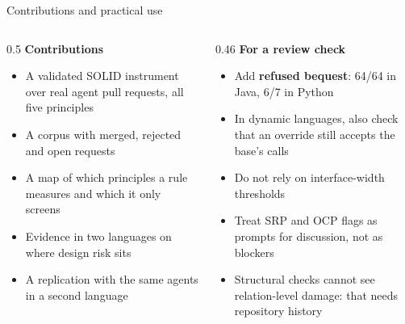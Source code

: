 \documentclass[11pt,aspectratio=169]{beamer}
\begin{document}
\begin{frame}{Contributions and practical use}
\begin{columns}[T,onlytextwidth]
\begin{column}{0.5\textwidth}
\textbf{Contributions}
\begin{itemize}\setlength{\itemsep}{3pt}\small
  \item A validated SOLID instrument over real agent pull requests, all five principles
  \item A corpus with merged, rejected and open requests
  \item A map of which principles a rule measures and which it only screens
  \item Evidence in two languages on where design risk sits
  \item A replication with the same agents in a second language
\end{itemize}
\end{column}
\begin{column}{0.46\textwidth}
\textbf{For a review check}
\begin{itemize}\setlength{\itemsep}{3pt}\small
  \item Add \textbf{refused bequest}: 64/64 in Java, 6/7 in Python
  \item In dynamic languages, also check that an override still accepts the base's calls
  \item Do not rely on interface-width thresholds
  \item Treat SRP and OCP flags as prompts for discussion, not as blockers
  \item Structural checks cannot see relation-level damage: that needs repository history
\end{itemize}
\end{column}
\end{columns}
\end{frame}
\end{document}
